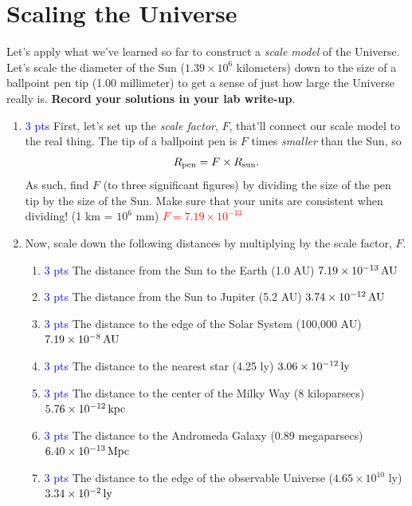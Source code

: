 \documentclass[11pt]{article}
\begin{document}
\section{Scaling the Universe}

Let's apply what we've learned so far to construct a \emph{scale model} of the Universe. Let's scale the diameter of the Sun ($1.39 \times 10^6$ kilometers) down to the size of a ballpoint pen tip (1.00 millimeter) to get a sense of just how large the Universe really is. \textbf{Record your solutions in your lab write-up}.


\begin{enumerate}
    \item \textcolor{blue}{3 pts} First, let's set up the \emph{scale factor}, $F$, that'll connect our scale model to the real thing. The tip of a ballpoint pen is $F$ times \emph{smaller} than the Sun, so $$R_{\rm pen} = F \times R_{\rm sun}.$$ As such, find $F$ (to three significant figures) by dividing the size of the pen tip by the size of the Sun. Make sure that your units are consistent when dividing! (1 km = $10^6$ mm) \textcolor{red}{$F = 7.19 \times 10^{-13}$}
    \item Now, scale down the following distances by multiplying by the scale factor, $F$.
    \begin{enumerate}
        \item \textcolor{blue}{3 pts} The distance from the Sun to the Earth (1.0 AU) \textcolor{red}{$7.19 \times 10^{-13} \, \rm{AU}$}
        \item \textcolor{blue}{3 pts} The distance from the Sun to Jupiter (5.2 AU) \textcolor{red}{$3.74 \times 10^{-12} \, \rm{AU}$}
        \item \textcolor{blue}{3 pts} The distance to the edge of the Solar System (100,000 AU) \textcolor{red}{$7.19 \times 10^{-8} \, \rm{AU}$}
        \item \textcolor{blue}{3 pts} The distance to the nearest star (4.25 ly) \textcolor{red}{$3.06 \times 10^{-12} \, \rm{ly}$}
        \item \textcolor{blue}{3 pts} The distance to the center of the Milky Way (8 kiloparsecs) \textcolor{red}{$5.76 \times 10^{-12} \, \rm{kpc}$}
        \item \textcolor{blue}{3 pts} The distance to the Andromeda Galaxy (0.89 megaparsecs) \textcolor{red}{$6.40 \times 10^{-13} \, \rm{Mpc}$}
        \item \textcolor{blue}{3 pts} The distance to the edge of the observable Universe ($4.65\times 10^{10}$ ly) \textcolor{red}{$3.34 \times 10^{-2} \, \rm{ly}$}
    \end{enumerate}
\end{enumerate}
\end{document}
